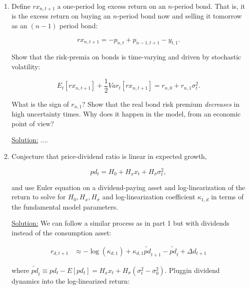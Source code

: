 \documentclass{article}
\begin{document}
\begin{enumerate}
\bigskip

\item Define $rx_{n,t+1}$ a one-period log excess return on an $n$-period bond. That is, it is the excess return on buying an $n$-period bond now and selling it tomorrow as an $(n - 1)$ period bond:

$$
rx_{n,t+1} = -p_{n,t} + p_{n-1,t+1} - y_{t,1}.
$$

Show that the risk-premia on bonds is time-varying and driven by stochastic volatility:

$$
E_t [r x_{n,t+1}] + \frac{1}{2}Var_t [r x_{n,t+1}] = r_{n,0} + r_{n,1} \sigma_t^2.
$$

What is the sign of $r_{n,1}$? Show that the real bond risk premium \textit{decreases} in high uncertainty times. Why does it happen in the model, from an economic point of view?

\bigskip

\underline{Solution:}  ....



\bigskip

\item Conjecture that price-dividend ratio is linear in expected growth, 

$$
pd_t = H_0 + H_x x_t + H_\sigma \sigma_t^2,
$$

and use Euler equation on a dividend-paying asset and log-linearization of the return to solve for $H_0, H_x, H_\sigma$ and log-linearization coefficient $\kappa_{1,d}$ in terms of the fundamental model parameters.

\bigskip

\underline{Solution:}  We can follow a similar process as in part 1 but with dividends instead of the consumption asset:

\begin{align*}
r_{d,t+1} &\approx - \log(\kappa_{d,1}) + \kappa_{d,1} \tilde{pd}_{t+1} - \tilde{pd}_t + \Delta d_{t+1}
\end{align*}

where $\tilde{pd}_t \equiv pd_t - E[pd_t] = H_x x_t + H_\sigma(\sigma_t^2 - \sigma_0^2)$. Pluggin dividend dynamics into the log-linearized return:


\end{enumerate}
\end{document}
